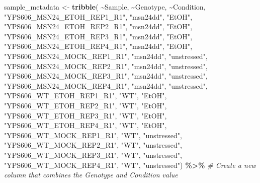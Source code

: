 \documentclass[
]{book}
\newenvironment{Shaded}{\begin{snugshade}}{\end{snugshade}}
\newcommand{\CommentTok}[1]{\textcolor[rgb]{0.56,0.35,0.01}{\textit{#1}}}
\newcommand{\FunctionTok}[1]{\textcolor[rgb]{0.13,0.29,0.53}{\textbf{#1}}}
\newcommand{\NormalTok}[1]{#1}
\newcommand{\OtherTok}[1]{\textcolor[rgb]{0.56,0.35,0.01}{#1}}
\newcommand{\SpecialCharTok}[1]{\textcolor[rgb]{0.81,0.36,0.00}{\textbf{#1}}}
\newcommand{\StringTok}[1]{\textcolor[rgb]{0.31,0.60,0.02}{#1}}
\begin{document}
\begin{Shaded}
\begin{Highlighting}[]
\NormalTok{sample\_metadata }\OtherTok{\textless{}{-}} \FunctionTok{tribble}\NormalTok{(}
  \SpecialCharTok{\textasciitilde{}}\NormalTok{Sample,                      }\SpecialCharTok{\textasciitilde{}}\NormalTok{Genotype,    }\SpecialCharTok{\textasciitilde{}}\NormalTok{Condition,}
  \StringTok{"YPS606\_MSN24\_ETOH\_REP1\_R1"}\NormalTok{,   }\StringTok{"msn24dd"}\NormalTok{,   }\StringTok{"EtOH"}\NormalTok{,}
  \StringTok{"YPS606\_MSN24\_ETOH\_REP2\_R1"}\NormalTok{,   }\StringTok{"msn24dd"}\NormalTok{,   }\StringTok{"EtOH"}\NormalTok{,}
  \StringTok{"YPS606\_MSN24\_ETOH\_REP3\_R1"}\NormalTok{,   }\StringTok{"msn24dd"}\NormalTok{,   }\StringTok{"EtOH"}\NormalTok{,}
  \StringTok{"YPS606\_MSN24\_ETOH\_REP4\_R1"}\NormalTok{,   }\StringTok{"msn24dd"}\NormalTok{,   }\StringTok{"EtOH"}\NormalTok{,}
  \StringTok{"YPS606\_MSN24\_MOCK\_REP1\_R1"}\NormalTok{,   }\StringTok{"msn24dd"}\NormalTok{,   }\StringTok{"unstressed"}\NormalTok{,}
  \StringTok{"YPS606\_MSN24\_MOCK\_REP2\_R1"}\NormalTok{,   }\StringTok{"msn24dd"}\NormalTok{,   }\StringTok{"unstressed"}\NormalTok{,}
  \StringTok{"YPS606\_MSN24\_MOCK\_REP3\_R1"}\NormalTok{,   }\StringTok{"msn24dd"}\NormalTok{,   }\StringTok{"unstressed"}\NormalTok{,}
  \StringTok{"YPS606\_MSN24\_MOCK\_REP4\_R1"}\NormalTok{,   }\StringTok{"msn24dd"}\NormalTok{,   }\StringTok{"unstressed"}\NormalTok{,}
  \StringTok{"YPS606\_WT\_ETOH\_REP1\_R1"}\NormalTok{,      }\StringTok{"WT"}\NormalTok{,        }\StringTok{"EtOH"}\NormalTok{,}
  \StringTok{"YPS606\_WT\_ETOH\_REP2\_R1"}\NormalTok{,      }\StringTok{"WT"}\NormalTok{,        }\StringTok{"EtOH"}\NormalTok{,}
  \StringTok{"YPS606\_WT\_ETOH\_REP3\_R1"}\NormalTok{,      }\StringTok{"WT"}\NormalTok{,        }\StringTok{"EtOH"}\NormalTok{,}
  \StringTok{"YPS606\_WT\_ETOH\_REP4\_R1"}\NormalTok{,      }\StringTok{"WT"}\NormalTok{,        }\StringTok{"EtOH"}\NormalTok{,}
  \StringTok{"YPS606\_WT\_MOCK\_REP1\_R1"}\NormalTok{,      }\StringTok{"WT"}\NormalTok{,        }\StringTok{"unstressed"}\NormalTok{,}
  \StringTok{"YPS606\_WT\_MOCK\_REP2\_R1"}\NormalTok{,      }\StringTok{"WT"}\NormalTok{,        }\StringTok{"unstressed"}\NormalTok{,}
  \StringTok{"YPS606\_WT\_MOCK\_REP3\_R1"}\NormalTok{,      }\StringTok{"WT"}\NormalTok{,        }\StringTok{"unstressed"}\NormalTok{,}
  \StringTok{"YPS606\_WT\_MOCK\_REP4\_R1"}\NormalTok{,      }\StringTok{"WT"}\NormalTok{,        }\StringTok{"unstressed"}\NormalTok{) }\SpecialCharTok{\%\textgreater{}\%}
  \CommentTok{\# Create a new column that combines the Genotype and Condition value}

\end{Highlighting}
\end{Shaded}
\end{document}
